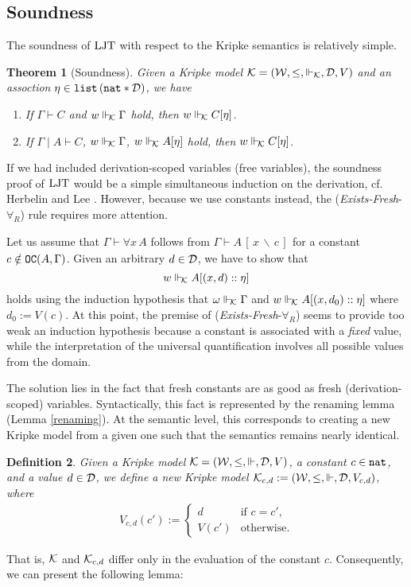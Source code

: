 \documentclass{svjour3}                     %
\newtheorem{thm}{Theorem}%
\newtheorem{defi}[thm]{Definition}
\newcommand{\cald}{{\cal D}}
\newcommand{\calk}{{\cal K}}
\newcommand{\calw}{{\cal W}}
\newcommand{\Ga}{\Gamma}
\newcommand{\om}{\omega}
\newcommand{\vd}{\vdash}
\newcommand{\Vd}{\Vdash}
\newcommand{\subst}[4]{#1\,[\,#2\, \backslash\, #3\,]_{#4}}
\newcommand{\tnat}{\textup{\tt nat}}
\newcommand{\tOC}{\textup{\tt OC}}
\newcommand{\tlist}{\textup{\tt list}}
\newcommand{\ljt}{\textup{LJT}}
\begin{document}
\subsection{Soundness}
The soundness of $\ljt$ with respect to the Kripke semantics is relatively simple.

\begin{thm}[Soundness]\label{soundness}
  Given a Kripke model $\calk = (\calw, \le,\Vd_\calk, \cald, V)$ and an assoction $\eta \in \tlist\, (\tnat \ast \cald)$, we have
  \begin{enumerate}
  \item If $\Ga \vd C$ and $w \Vd_{\!\calk} \Ga$ hold, then $w \Vd_{\!\calk} C [\eta]$.
  \item If $\Ga \mid A \vd C$, $w \Vd_{\!\calk} \Ga$, $w \Vd_{\!\calk} A [\eta]$ hold, then $w\Vd_{\!\calk} C[\eta]$.
  \end{enumerate}
\end{thm}

If we had included derivation-scoped variables (free variables), the soundness proof of $\ljt$ would be a simple simultaneous induction on the derivation, cf. Herbelin and Lee \cite{wollic09}. However, because we use constants instead, the ({\it Exists-Fresh}-$\forall_R$) rule requires more attention.

Let us assume that $\Ga\vd  \forall x\, A$ follows from $\Ga \vd \subst{A}{x}{c}{}$ for a constant $c \notin \tOC(A, \Ga)$.
Given an arbitrary $d \in \cald$, we have to show that
\begin{equation}
  \label{eq:forall}
  w \Vd_{\!\calk} A [(x,d)::\eta]
\end{equation}
holds using the induction hypothesis that $\om \Vd_{\!\calk} \Ga$ and $w \Vd_{\!\calk} A [(x,d_0)::\eta]$ where $d_0 := V(c)$. At this point, the premise of ({\it Exists-Fresh}-$\forall_R$) seems to provide too weak an induction hypothesis because a constant is associated with a \textit{fixed} value, while the interpretation of the universal quantification involves all possible values from the domain. 

The solution lies in the fact that fresh constants are as good as fresh (derivation-scoped) variables. Syntactically, this fact is represented by the renaming lemma (Lemma \ref{renaming}). At the semantic level, this corresponds to creating a new Kripke model from a given one such that the semantics remains nearly identical.

\begin{defi}
  Given a Kripke model $\calk = (\calw, \le, \Vd, \cald, V)$, a constant $c \in \tnat$, and a value $d \in \cald$, we define a new Kripke model $\calk_{c,d} := (\calw, \le,\Vd, \cald, V_{c,d})$, where
  \begin{eqnarray*}
    V_{c,d} (c') :=
    \begin{cases}
      d & \text{if } c = c', \\
      V(c') & \text{otherwise.}
    \end{cases}
  \end{eqnarray*}
\end{defi}
That is, $\calk$ and $\calk_{c,d}$ differ only in the evaluation of the constant $c$. Consequently, we can present the following lemma:
\end{document}
